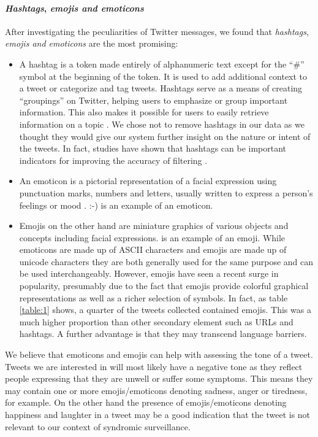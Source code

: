 \documentclass[10pt,letterpaper]{article}
\begin{document}
\paragraph {\textit{Hashtags}, \textit{emojis and emoticons} }
After investigating the peculiarities of Twitter messages,  we found that \textit{hashtags}, \textit{emojis and emoticons} are the most promising:
\begin{itemize}
\item A hashtag is a token made entirely of alphanumeric text except for the ``\#'' symbol at the beginning of the token. It is used to add additional context to a tweet or categorize and tag tweets. Hashtags serve as a means of creating ``groupings'' on Twitter, helping users to emphasize or group important information. This also makes it possible for users to easily retrieve information on a topic \cite{REF9}. We chose not to remove hashtags in our data as we thought they would give our system further insight on the nature or intent of the tweets. In fact, studies have shown that hashtags can be important indicators for improving the accuracy of filtering \cite{REF13,REF12,REF11}.

\item An emoticon is a pictorial representation of a facial expression using punctuation marks, numbers and letters, usually written to express a person's feelings or mood \cite{REF14}. :-) is an example of an emoticon. 
\item Emojis on the other hand are miniature graphics of various objects and concepts including facial expressions.  is an example of an emoji. While emoticons are made up of ASCII characters and emojis are made up of unicode characters they are both generally used for the same purpose and can be used interchangeably. However, emojis have seen a recent surge in popularity, presumably due to the fact that emojis provide colorful graphical representations as well as a richer selection of symbols. In fact, as table \ref{table:1} shows, a quarter of the tweets collected contained emojis. This was a much higher proportion than other secondary element such as URLs and hashtags.  A further advantage is that they may transcend language barriers. 
\end{itemize}

We believe that emoticons and emojis can help with assessing the tone of a tweet. Tweets we are interested in will most likely have a negative tone as they reflect people expressing that they are unwell or suffer some symptoms. This means they may contain one or more emojis/emoticons denoting sadness, anger or tiredness, for example. On the other hand the presence of emojis/emoticons denoting happiness and laughter in a tweet may be a good indication that the tweet is not relevant to our context of syndromic surveillance.\\
\end{document}
